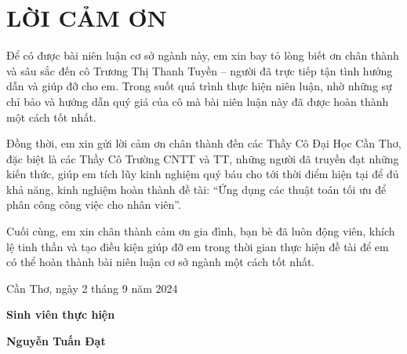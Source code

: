 \section*{LỜI CẢM ƠN}
Để có được bài niên luận cơ sở ngành này, em xin bay tỏ lòng biết ơn chân thành và
sâu sắc đến cô Trương Thị Thanh Tuyền – người đã trực tiếp tận tình hướng dẫn và giúp
đỡ cho em. Trong suốt quá trình thực hiện niên luận, nhờ những sự chỉ bảo và hướng dẫn
quý giá của cô mà bài niên luận này đã được hoàn thành một cách tốt nhất.
\par
Đồng thời, em xin gửi lời cảm ơn chân thành đến các Thầy Cô Đại Học Cần Thơ,
đặc biệt là các Thầy Cô Trường CNTT và TT, những người đã truyền đạt những kiến thức,
giúp em tích lũy kinh nghiệm quý báu cho tới thời điểm hiện tại để đủ khả năng, kinh
nghiệm hoàn thành đề tài: “Ứng dụng các thuật toán tối ưu để phân công công việc cho nhân viên”.
\par
Cuối cùng, em xin chân thành cảm ơn gia đình, bạn bè đã luôn động viên, khích lệ
tinh thần và tạo điều kiện giúp đỡ em trong thời gian thực hiện đề tài để em có thể hoàn
thành bài niên luận cơ sở ngành một cách tốt nhất.

\vspace{6pt}
\hspace{7cm}Cần Thơ, ngày 2 tháng 9 năm 2024

\hspace{9cm}\textbf{Sinh viên thực hiện}

\vspace{2cm}
\hspace{9.25cm}\textbf{Nguyễn Tuấn Đạt}
\thispagestyle{empty}
\newpage
